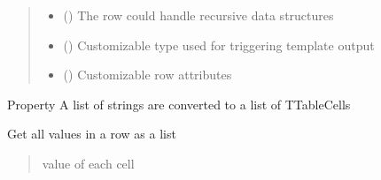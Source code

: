 \documentclass[letterpaper,10pt,english]{sphinxmanual}
\begin{document}
\begin{savenotes}
\begin{fulllineitems}
\begin{quote}
\begin{description}
\begin{itemize}
\item {} 
\sphinxAtStartPar
{} ({\hyperref[\detokenize{eezz:eezz.table.TTable}]{}}) \textendash{} The row could handle recursive data structures

\item {} 
\sphinxAtStartPar
{} () \textendash{} Customizable type used for triggering template output

\item {} 
\sphinxAtStartPar
{} () \textendash{} Customizable row attributes

\end{itemize}

\end{description}\end{quote}

\begin{savenotes}\begin{fulllineitems}
\label{\detokenize{eezz:eezz.table.TTableRow.cells}}
\pysigstartsignatures
{}
\pysigstopsignatures
\sphinxAtStartPar
Property \sphinxhyphen{} A list of strings are converted to a list of TTableCells

\end{fulllineitems}\end{savenotes}


\begin{savenotes}\begin{fulllineitems}
\label{\detokenize{eezz:eezz.table.TTableRow.get_values_list}}
\pysigstartsignatures
{}
\pysigstopsignatures
\sphinxAtStartPar
Get all values in a row as a list
\begin{quote}\begin{description}
\sphinxAtStartPar
value of each cell


\end{description}
\end{quote}
\end{fulllineitems}
\end{savenotes}
\end{fulllineitems}
\end{savenotes}
\end{document}
